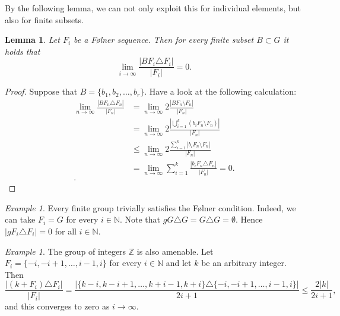 \documentclass[titlepage, a4paper]{article}
\newcommand{\N}{\mathbb{N}}
\newcommand{\Z}{\mathbb{Z}}
\newcommand{\card}[1]{\left| #1 \right|}
\newtheorem{lemma}[theorem]{Lemma}
\theoremstyle{remark}
\newtheorem{example}[theorem]{Example}
\begin{document}
By the following lemma, we can not only exploit this for individual elements, but also for finite subsets.
\begin{lemma}\label{lem:folner_finite_subset}
    Let $F_i$ be a Følner sequence. Then for every finite subset $B \subset G$ it holds that  \[
    \lim_{i \to \infty} \frac{\card{BF_i \triangle F_i}}{\card{F_i}} = 0    
    .\] 
\end{lemma}
\begin{proof}
    Suppose that $B = \{b_1, b_2, \ldots, b_r\} $. 
    Have a look at the following calculation:
    \begin{align*}
        \lim_{n \to \infty} \frac{\card{BF_n \triangle F_n}}{\card{F_n}} &= \lim_{n \to \infty} 2 \frac{\card{BF_n \setminus F_n}}{\card{F_n}} \\
                                         &= \lim_{n \to \infty} 2 \frac{\card{\bigcup_{i = 1}^{k} (b_i F_n \setminus F_n)}}{\card{F_n}} \\
                                         &\le \lim_{n \to \infty} 2\frac{\sum_{i-1}^{k} \card{b_i F_n \setminus F_n}}{\card{F_n}} \\
                                         &= \lim_{n \to \infty} \sum_{i = 1}^{k} \frac{\card{b_iF_n \triangle F_n}}{\card{F_n}} = 0.  \\
    .\end{align*}
\end{proof}

\begin{example}\label{ex:finite_group_folner}
    Every finite group trivially satisfies the Følner condition. Indeed, we can take $F_i = G$ for every $i \in \N$. Note that $gG \triangle G = G \triangle G = \emptyset$. Hence $\card{gF_i\triangle F_i} = 0$ for all $i \in \N$.
\end{example}

\begin{example}\label{ex:integers_folner}
    The group of integers $\Z$ is also amenable. Let $F_i = \{-i, -i+1, \dots, i-1, i\}$ for every $i \in \N$ and let $k$ be an arbitrary integer. Then
    \[
        \frac{\card{(k + F_i) \triangle F_i}}{\card{F_i}}
        = \frac{\card{\{k-i, k-i+1, \dots, k+i-1, k+i\}\triangle \{-i, -i+1, \dots, i-1, i\}}}{2i+1}
        \leq \frac{2|k|}{2i+1},
    \]
    and this converges to zero as $i \to \infty$.
\end{example}
\end{document}
